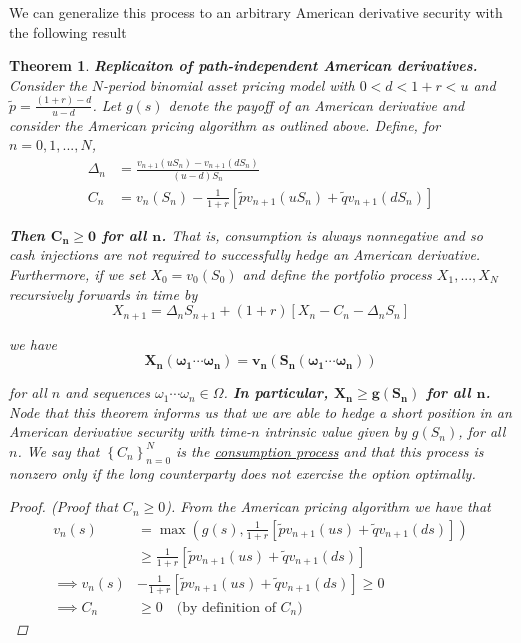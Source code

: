 \documentclass[12pt]{article}
\newtheorem{theorem}{Theorem}
\newlength\tindent
\renewcommand{\indent}{\hspace*{\tindent}}
\begin{document}
\indent We can generalize this process to an arbitrary American derivative security with the following result
\begin{theorem}{\bf Replicaiton of path-independent American derivatives.} Consider the $N$-period binomial asset pricing model with $0 < d < 1 + r < u$ and $\tilde{p} = \frac{(1 + r) - d}{u - d}$. Let $g(s)$ denote the payoff of an American derivative and consider the American pricing algorithm as outlined above. Define, for $n = 0,1,..., N$,
\begin{align*}
	\Delta_n &= \frac{v_{n + 1}(uS_n) - v_{n + 1}(dS_n)}{(u - d)S_n} \\
	C_n &= v_n(S_n) - \frac{1}{1 + r}\left[\tilde{p}v_{n + 1}(uS_n) + \tilde{q}v_{n + 1}(dS_n) \right]
\end{align*}

{\bf Then $\bm{ C_n \geq 0}$ for all $\bm n$.} That is, consumption is always nonnegative and so cash injections are not required to successfully hedge an American derivative. Furthermore, if we set $X_0 = v_0(S_0)$ and define the portfolio process $X_1,...,X_N$ recursively forwards in time by
\begin{equation*}
	X_{n + 1} = \Delta_nS_{n + 1} + (1 + r)[X_n - C_n - \Delta_nS_n]
\end{equation*}

we have
\begin{equation*}
	\bm{X_n(\omega_1\cdots\omega_n) = v_n(S_n(\omega_1\cdots\omega_n))}
\end{equation*}

for all $n$ and sequences $\omega_1\cdots\omega_n \in \Omega$. {\bf In particular, $\bm{X_n \geq g(S_n)}$ for all $\bm n$.} \\

\indent Node that this theorem informs us that we are able to hedge a short position in an American derivative security with time-$n$ intrinsic value given by $g(S_n)$, for all $n$. We say that $\left\{C_n\right\}^N_{n = 0}$ is the \underline{consumption process} and that this process is nonzero only if the long counterparty does not exercise the option optimally.

\begin{proof} {(\em Proof that $C_n \geq 0$)}. From the American pricing algorithm we have that
\begin{align*}
	v_n(s) &= \max \left( g(s), \frac{1}{1 + r}[\tilde{p}v_{n + 1}(us) + \tilde{q}v_{n + 1}(ds)] \right) \\
	&\geq \frac{1}{1 + r}[\tilde{p}v_{n + 1}(us) + \tilde{q}v_{n + 1}(ds)] \\
	\implies v_n(s) &- \frac{1}{1 + r}[\tilde{p}v_{n + 1}(us) + \tilde{q}v_{n + 1}(ds)] \geq 0 \\
	\implies C_n &\geq 0 \quad \text{(by definition of $C_n$)}
\end{align*}


\end{proof}
\end{theorem}
\end{document}
